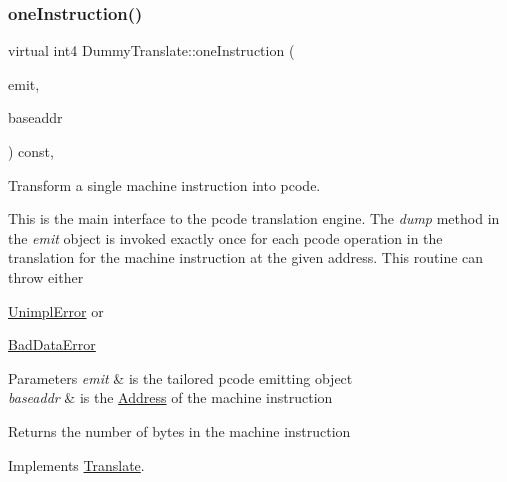 \mbox{\label{class_dummy_translate_a429150e7328be97b17b7ee7211c23841}} 
\subsubsection{\texorpdfstring{oneInstruction()}{oneInstruction()}}
{\footnotesize\ttfamily virtual int4 Dummy\+Translate\+::one\+Instruction (\begin{DoxyParamCaption}\item[{\mbox{\hyperlink{class_pcode_emit}{Pcode\+Emit}} \&}]{emit,  }\item[{const \mbox{\hyperlink{class_address}{Address}} \&}]{baseaddr }\end{DoxyParamCaption}) const\hspace{0.3cm}{\ttfamily [inline]}, {\ttfamily [virtual]}}



Transform a single machine instruction into pcode. 

This is the main interface to the pcode translation engine. The {\itshape dump} method in the {\itshape emit} object is invoked exactly once for each pcode operation in the translation for the machine instruction at the given address. This routine can throw either
\begin{DoxyItemize}
\item \mbox{\hyperlink{struct_unimpl_error}{Unimpl\+Error}} or
\item \mbox{\hyperlink{struct_bad_data_error}{Bad\+Data\+Error}}
\end{DoxyItemize}


\begin{DoxyParams}{Parameters}
{\em emit} & is the tailored pcode emitting object \\
\hline
{\em baseaddr} & is the \mbox{\hyperlink{class_address}{Address}} of the machine instruction \\
\hline
\end{DoxyParams}
\begin{DoxyReturn}{Returns}
the number of bytes in the machine instruction 
\end{DoxyReturn}


Implements \mbox{\hyperlink{class_translate_a1737782c38ee43de62ae2e7572321fc9}{Translate}}.



